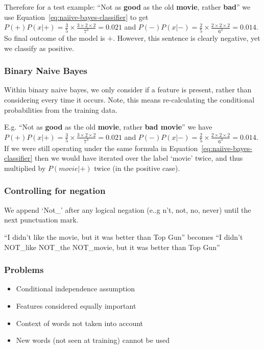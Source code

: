 \documentclass[11pt]{article}
\begin{document}
Therefore for a test example: ``Not as \textbf{good} as the old \textbf{movie}, rather \textbf{bad}'' we use Equation~\ref{eq:naiive-bayes-classifier} to get $P(+)P(x|+) = \frac 3 5 \times \frac{3\times 2 \times 2}{7^3} = 0.021$ and $P(-)P(x|-) = \frac 2 5 \times \frac{2\times 2 \times 2}{6^3} = 0.014$. So final outcome of the model is $+$. However, this sentence is clearly negative, yet we classify as positive.

\subsubsection{Binary Naive Bayes}

Within binary naive bayes, we only consider if a feature is present, rather than considering every time it occurs. Note, this means re-calculating the conditional probabilities from the training data.

E.g. ``Not as \textbf{good} as the old \textbf{movie}, rather \textbf{bad movie}'' we have $P(+)P(x|+) = \frac 3 5 \times \frac{3\times 2 \times 2}{7^3} = 0.021$ and $P(-)P(x|-) = \frac 2 5 \times \frac{2 \times 2 \times 2}{6^3} = 0.014$. If we were still operating under the same formula in Equation~\ref{eq:naiive-bayes-classifier} then we would have iterated over the label `movie' twice, and thus multiplied by $P(movie|+)$ twice (in the positive case).

\subsubsection{Controlling for negation}

We append `Not\_' after any logical negation (e..g n't, not, no, never) until the next punctuation mark.

``I didn't like the movie, but it was better than Top Gun'' becomes ``I didn't NOT\_like NOT\_the NOT\_movie, but it was better than Top Gun''

\subsubsection{Problems}

\begin{itemize}
    \item Conditional independence assumption
    \item Features considered equally important
    \item Context of words not taken into account
    \item New words (not seen at training) cannot be used
\end{itemize}
\end{document}
